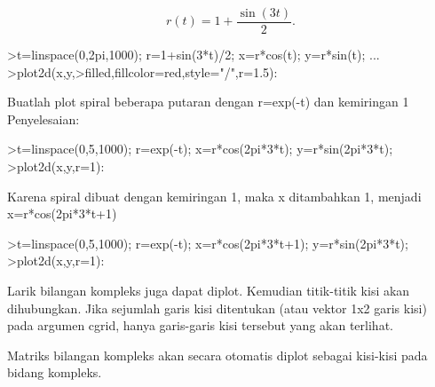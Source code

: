\documentclass{article}
\begin{document}
\begin{eulernotebook}
\begin{eulercomment}
\begin{eulercomment}
\begin{eulercomment}
\begin{eulercomment}
\begin{eulercomment}
\begin{eulercomment}
\begin{eulercomment}
\begin{eulercomment}
\begin{eulercomment}
\begin{eulercomment}
\begin{eulercomment}
\end{eulercomment}
\begin{eulerformula}
\[
r(t) = 1 + \dfrac{\sin(3t)}{2}.
\]
\end{eulerformula}
\begin{eulerprompt}
>t=linspace(0,2pi,1000); r=1+sin(3*t)/2; x=r*cos(t); y=r*sin(t); ...
>plot2d(x,y,>filled,fillcolor=red,style="/",r=1.5):
\end{eulerprompt}
\eulersubheading{}
\begin{eulercomment}
Buatlah plot spiral beberapa putaran dengan r=exp(-t) dan kemiringan 1\\
Penyelesaian:
\end{eulercomment}
\begin{eulerprompt}
>t=linspace(0,5,1000); r=exp(-t); x=r*cos(2pi*3*t); y=r*sin(2pi*3*t);
>plot2d(x,y,r=1):
\end{eulerprompt}
\begin{eulercomment}
Karena spiral dibuat dengan kemiringan 1, maka x ditambahkan 1,
menjadi x=r*cos(2pi*3*t+1)
\end{eulercomment}
\begin{eulerprompt}
>t=linspace(0,5,1000); r=exp(-t); x=r*cos(2pi*3*t+1); y=r*sin(2pi*3*t);
>plot2d(x,y,r=1):
\end{eulerprompt}
\begin{eulercomment}
Larik bilangan kompleks juga dapat diplot. Kemudian titik-titik kisi
akan dihubungkan. Jika sejumlah garis kisi ditentukan (atau vektor 1x2
garis kisi) pada argumen cgrid, hanya garis-garis kisi tersebut yang
akan terlihat.

Matriks bilangan kompleks akan secara otomatis diplot sebagai
kisi-kisi pada bidang kompleks.


\end{eulercomment}
\end{eulercomment}
\end{eulercomment}
\end{eulercomment}
\end{eulercomment}
\end{eulercomment}
\end{eulercomment}
\end{eulercomment}
\end{eulercomment}
\end{eulercomment}
\end{eulercomment}
\end{eulernotebook}
\end{document}
